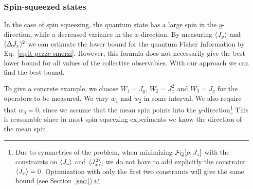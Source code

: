 \subsubsection{Spin-squeezed states}

In the case of spin squeezing, the quantum state has a large spin in the $y$-direction, while a decreased variance in the $x$-direction.
By measuring $\langle J_y \rangle$ and $(\Delta J_x )^2$ we can estimate the lower bound for the quantum Fisher Information by Eq.~\eqref{eq:lt-pezze-smerzi}.
However, this formula does not necessarily give the best lower bound for all values of the collective observables.
With our approach we can find the best bound.

To give a concrete example, we choose $W_1=J_y$, $W_2=J_x^2$ and $W_3=J_x$ for the operators to be measured.
We vary $w_1$ and $w_2$ in some interval.
We also require that $w_3=0$, since we assume that the mean spin points into the $y$-direction\footnote{Due to symmetries of the problem, when minimizing $\mathcal{F}_{\textnormal{Q}}[\rho,J_z]$ with the constraints on $\langle J_z \rangle$ and $\langle J_x^2 \rangle$, we do not have to add explicitly the constraint $\langle J_x \rangle=0$.
Optimization with only the first two constraints will give the same bound (see Section~\ref{sec:}).}
This is reasonable since in most spin-squeezing experiments we know the direction of the mean spin.

